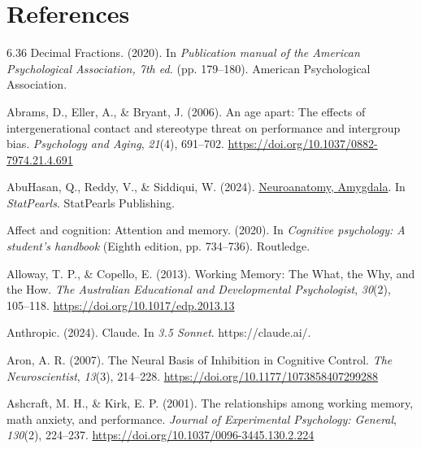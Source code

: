 \documentclass[
  stu, a4paper, 12pt,mask,floatsintext]{apa7}
\newlength{\cslhangindent}
\newenvironment{CSLReferences}[2] %
 {\begin{list}{}{%
  \setlength{\itemindent}{0pt}
  \setlength{\leftmargin}{0pt}
  \setlength{\parsep}{0pt}
  \ifodd #1
   \setlength{\leftmargin}{\cslhangindent}
   \setlength{\itemindent}{-1\cslhangindent}
  \fi
  \setlength{\itemsep}{#2\baselineskip}}}
 {\end{list}}
\begin{document}
\newpage

\section{References}\label{references}

\setlength{\parindent}{-0.5in}
\setlength{\leftskip}{0.5in}
\setlength{\parskip}{8pt}

\label{refs}
\begin{CSLReferences}{1}{0}
6.36 {Decimal Fractions}. (2020). In \emph{Publication manual of the {American Psychological Association}, 7th ed.} (pp. 179--180). American Psychological Association.

Abrams, D., Eller, A., \& Bryant, J. (2006). An age apart: {The} effects of intergenerational contact and stereotype threat on performance and intergroup bias. \emph{Psychology and Aging}, \emph{21}(4), 691--702. \url{https://doi.org/10.1037/0882-7974.21.4.691}

AbuHasan, Q., Reddy, V., \& Siddiqui, W. (2024). \href{https://www.ncbi.nlm.nih.gov/pubmed/30725787}{Neuroanatomy, {Amygdala}}. In \emph{{StatPearls}}. StatPearls Publishing.

Affect and cognition: Attention and memory. (2020). In \emph{Cognitive psychology: A student's handbook} (Eighth edition, pp. 734--736). Routledge.

Alloway, T. P., \& Copello, E. (2013). Working {Memory}: {The What}, the {Why}, and the {How}. \emph{The Australian Educational and Developmental Psychologist}, \emph{30}(2), 105--118. \url{https://doi.org/10.1017/edp.2013.13}

Anthropic. (2024). Claude. In \emph{3.5 Sonnet}. https://claude.ai/.

Aron, A. R. (2007). The {Neural Basis} of {Inhibition} in {Cognitive Control}. \emph{The Neuroscientist}, \emph{13}(3), 214--228. \url{https://doi.org/10.1177/1073858407299288}

Ashcraft, M. H., \& Kirk, E. P. (2001). The relationships among working memory, math anxiety, and performance. \emph{Journal of Experimental Psychology: General}, \emph{130}(2), 224--237. \url{https://doi.org/10.1037/0096-3445.130.2.224}


\end{CSLReferences}
\end{document}
